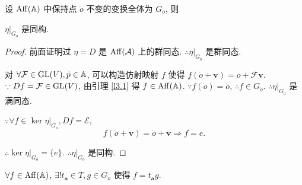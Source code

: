 \documentclass[color=black,device=normal,lang=cn,mode=geye]{elegantnote}
\begin{document}
设 $\operatorname{Aff} (\mathbb{A})$ 中保持点 $\dot{o}$ 不变的变换全体为 $G_{\dot{o}}$, 则
\begin{lemma}\label{l3.3}
    $\eta|_{G_{\dot{o}}}$ 是同构.
\end{lemma}
\begin{proof}
    前面证明过 $\eta=D$ 是 $\operatorname{Aff} (\mathcal{A})$ 上的群同态. $\therefore\eta|_{G_{\dot{o}}}$ 是群同态.

    对 $\forall\mathcal{F}\in\operatorname{GL} (V),\dot{p}\in\mathbb{A}$, 可以构造仿射映射 $f$ 使得 $f(\dot{o}+\boldsymbol{v})=\dot{o}+\mathcal{F}\boldsymbol{v}$. $\because Df=\mathcal{F}\in\operatorname{GL} (V)$, 由引理 \ref{l3.1} 得 $f\in\operatorname{Aff} (\mathbb{A})$. $\because f(\dot{o})=\dot{o}$, $\therefore f\in G_{\dot{o}}$. $\therefore \eta|_{G_{\dot{o}}}$ 是满同态.
    
    $\because\forall f\in\ker\eta|_{G_{\dot{o}}},Df=\mathcal{E}$,
    \[f(\dot{o}+\boldsymbol{v})=\dot{o}+\boldsymbol{v}\Rightarrow f=e.\]

    $\therefore\ker\eta|_{G_{\dot{o}}}=\{e\}$. $\therefore\eta|_{G_{\dot{o}}}$ 是同构.
\end{proof}
\begin{theorem}\label{t3.1}
    $\forall f\in\operatorname{Aff} (\mathbb{A})$, $\exists!t_{\boldsymbol{a}}\in T,g\in G_{\dot{o}}$ 使得 $f=t_{\boldsymbol{a}}g$.
\end{theorem}
\end{document}
